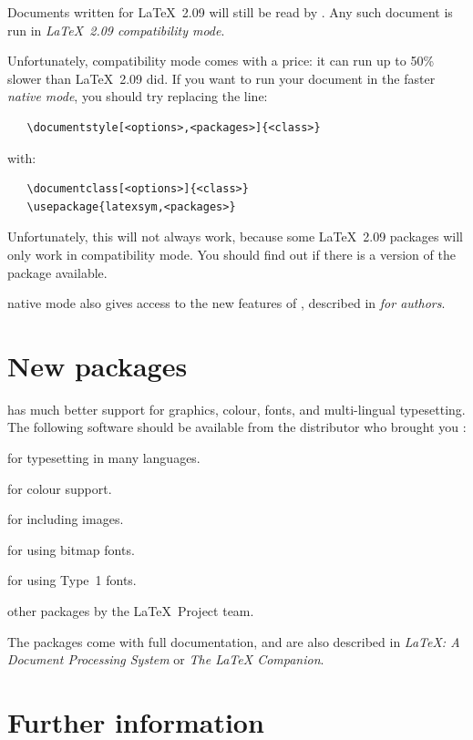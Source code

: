 \documentclass{ltnews}
\begin{document}
Documents written for \LaTeX~2.09 will
still be read by \LaTeXe.  Any such document is run in
\emph{\LaTeX~2.09 compatibility mode}.

Unfortunately, compatibility mode comes with a price: it can run
up to 50\% slower than \LaTeX~2.09 did.  If you want to run your document
in the faster \emph{native mode}, you should try replacing the line:
\begin{verbatim}
   \documentstyle[<options>,<packages>]{<class>}
\end{verbatim}
with:
\begin{verbatim}
   \documentclass[<options>]{<class>}
   \usepackage{latexsym,<packages>}
\end{verbatim}
Unfortunately, this will not always work, because some \LaTeX~2.09
packages will only work in \LaTeXe{} compatibility mode.  You should find
out if there is a \LaTeXe{} version of the package available.

\LaTeXe{} native mode also gives access to the new features of \LaTeXe,
described in \emph{\LaTeXe{} for authors}.

\section{New packages}

\LaTeXe{} has much better support for graphics, colour, fonts, and
multi-lingual typesetting.  The following software should be available
from the distributor who brought you \LaTeXe:

\begin{citations}
\item[babel] for typesetting in many languages.
\item[color] for colour support.
\item[graphics] for including images.
\item[mfnfss] for using bitmap fonts.
\item[psnfss] for using Type~1 fonts.
\item[tools]  other packages by the \LaTeX\ Project team.
\end{citations}
The packages come with full documentation, and are also described in
\emph{\LaTeX: A Document Processing System} or
\emph{The \LaTeX{} Companion}.

\section{Further information}
\end{document}
